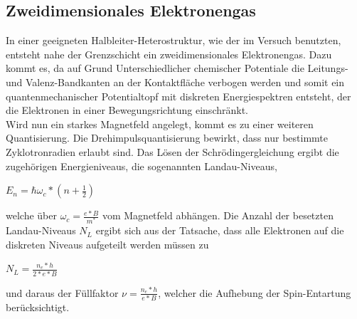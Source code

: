 \documentclass[10pt,a4paper]{article}
\begin{document}
\subsection*{Zweidimensionales Elektronengas}
In einer geeigneten Halbleiter-Heterostruktur, wie der im Versuch benutzten, entsteht nahe der Grenzschicht ein zweidimensionales Elektronengas. Dazu kommt es, da auf Grund Unterschiedlicher chemischer Potentiale die Leitungs- und Valenz-Bandkanten an der Kontaktfläche verbogen werden und somit ein quantenmechanischer Potentialtopf mit diskreten Energiespektren entsteht, der die Elektronen in einer Bewegungsrichtung einschränkt.\\
Wird nun ein starkes Magnetfeld angelegt, kommt es zu einer weiteren Quantisierung. Die Drehimpulsquantisierung bewirkt, dass nur bestimmte Zyklotronradien erlaubt sind. Das Lösen der Schrödingergleichung ergibt die zugehörigen Energieniveaus, die sogenannten Landau-Niveaus, 
\begin{center}
$E_n=\hbar\omega _c*(n+\frac{1}{2}) $
\end{center} 
welche über $ \omega _c=\frac{e*B}{m^*} $ vom Magnetfeld abhängen. Die Anzahl der besetzten Landau-Niveaus $ N_{L} $ ergibt sich aus der Tatsache, dass alle Elektronen auf die diskreten Niveaus aufgeteilt werden müssen zu
\begin{center} 
$ N_L=\frac{n_e*h}{2*e*B} $
\end{center}
und daraus der Füllfaktor $ \nu=\frac{n_e*h}{e*B} $, welcher die Aufhebung der Spin-Entartung berücksichtigt.\\
\end{document}
